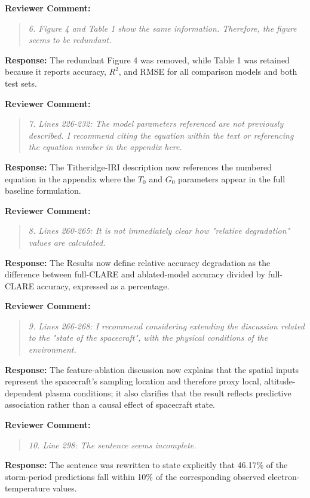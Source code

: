 \documentclass[a4paper,12pt]{article}
\newcommand{\reviewercomment}[1]{%
  \begin{samepage}%
  \par\noindent\textbf{Reviewer Comment:}\par
  \begin{quote}\itshape #1\end{quote}}
\newcommand{\filledresponse}[1]{%
  \par\noindent\textbf{Response:} #1\par
  \vspace{0.4cm}%
  \end{samepage}}
\begin{document}
\reviewercomment{6. Figure 4 and Table 1 show the same information. Therefore, the figure seems to be redundant.}
\filledresponse{The redundant Figure 4 was removed, while Table 1 was retained because it reports
accuracy, $R^2$, and RMSE for all comparison models and both test sets.}

\reviewercomment{7. Lines 226-232: The model parameters referenced are not previously described. I recommend citing
the equation within the text or referencing the equation number in the appendix here.}
\filledresponse{The Titheridge-IRI description now references the numbered equation in the
appendix where the $T_0$ and $G_0$ parameters appear in the full baseline formulation.}

\reviewercomment{8. Lines 260-265: It is not immediately clear how "relative degradation" values are calculated.}
\filledresponse{The Results now define relative accuracy degradation as the difference between
full-CLARE and ablated-model accuracy divided by full-CLARE accuracy, expressed as a percentage.}

\reviewercomment{9. Lines 266-268: I recommend considering extending the discussion related to the "state of the
spacecraft", with the physical conditions of the environment.}
\filledresponse{The feature-ablation discussion now explains that the spatial inputs represent the spacecraft's sampling location and therefore proxy local, altitude-dependent plasma conditions; it also clarifies that the result reflects predictive association rather than a causal effect of spacecraft state.}

\reviewercomment{10. Line 298: The sentence seems incomplete.}
\filledresponse{The sentence was rewritten to state explicitly that 46.17\% of the storm-period predictions fall within 10\% of the corresponding observed electron-temperature values.}
\end{document}
